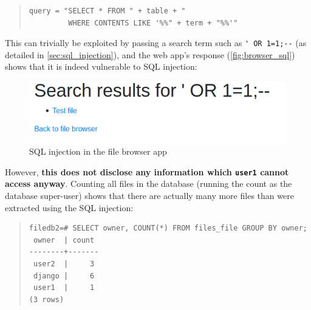 \documentclass[12pt]{report}
\begin{document}
\begin{quote}
\begin{samepage}
\begin{verbatim}
query = "SELECT * FROM " + table + "
         WHERE CONTENTS LIKE '%%" + term + "%%'"
\end{verbatim}
\end{samepage}
\end{quote}

This can trivially be exploited by passing a search term such as \verb+' OR 1=1;--+ (as detailed in \autoref{sec:sql_injection}), and the web app's response (\autoref{fig:browser_sql}) shows that it is indeed vulnerable to SQL injection:

\begin{figure}[ht]
  \begin{center}
    \includegraphics[scale=0.5]{08-browser4-sql.png}
  \end{center}
  \caption{SQL injection in the file browser app}
  \label{fig:browser_sql}
\end{figure}

However, \textbf{this does not disclose any information which \texttt{user1} cannot access anyway}. Counting all files in the database (running the count as the database super-user) shows that there are actually many more files than were extracted using the SQL injection:

\begin{quote}
\begin{samepage}
\begin{verbatim}
filedb2=# SELECT owner, COUNT(*) FROM files_file GROUP BY owner;
 owner  | count
--------+-------
 user2  |     3
 django |     6
 user1  |     1
(3 rows)
\end{verbatim}
\end{samepage}
\end{quote}

\end{document}
